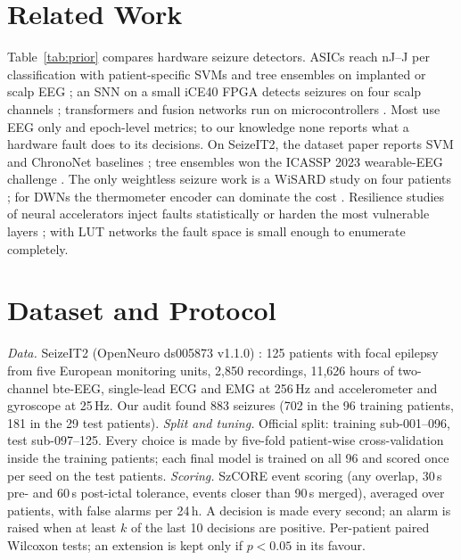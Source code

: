 \documentclass[conference]{IEEEtran}
\begin{document}
\section{Related Work}
Table~\ref{tab:prior} compares hardware seizure detectors. ASICs reach nJ--\textmu J per classification with
patient-specific SVMs and tree ensembles on implanted or scalp EEG \cite{altaf2015jssc,shoaran2018jetcas,shin2022neuraltree};
an SNN on a small iCE40 FPGA detects seizures on four scalp channels \cite{busia2025fpga}; transformers and fusion
networks run on microcontrollers \cite{busia2024eegformer,ingolfsson2024brainfusenet}. Most use EEG only and
epoch-level metrics; to our knowledge none reports what a hardware fault does to its decisions. On SeizeIT2, the dataset paper reports
SVM and ChronoNet \cite{roy2019chrononet} baselines \cite{bhagubai2025seizeit2}; tree ensembles won the ICASSP 2023
wearable-EEG challenge \cite{bhagubai2024challenge,alhussaini2023seizft}. The only weightless seizure work is a WiSARD
study on four patients \cite{deaguiar2015wisard}; for DWNs the thermometer encoder can dominate the cost
\cite{mecik2025thermo}. Resilience studies of neural accelerators inject faults statistically
\cite{reagen2018ares,li2017sc} or harden the most vulnerable layers \cite{libano2019selective}; with LUT networks the
fault space is small enough to enumerate completely.



\section{Dataset and Protocol}
\textit{Data.} SeizeIT2 (OpenNeuro ds005873 v1.1.0) \cite{bhagubai2025seizeit2}: 125 patients with focal epilepsy from
five European monitoring units, 2,850 recordings, 11,626 hours of two-channel bte-EEG, single-lead ECG and EMG at
256\,Hz and accelerometer and gyroscope at 25\,Hz. Our audit found 883 seizures (702 in the 96 training patients, 181
in the 29 test patients). \textit{Split and tuning.} Official split: training sub-001--096, test sub-097--125. Every
choice is made by five-fold patient-wise cross-validation inside the training patients; each final model is trained
on all 96 and scored once per seed on the test patients. \textit{Scoring.} SzCORE event scoring \cite{dan2024szcore}
(any overlap, 30\,s pre- and 60\,s post-ictal tolerance, events closer than 90\,s merged), averaged over patients,
with false alarms per 24\,h. A decision is made every second; an alarm is raised when at least $k$ of the last 10
decisions are positive. Per-patient paired Wilcoxon tests; an extension is kept only if $p < 0.05$ in its favour.
\end{document}

